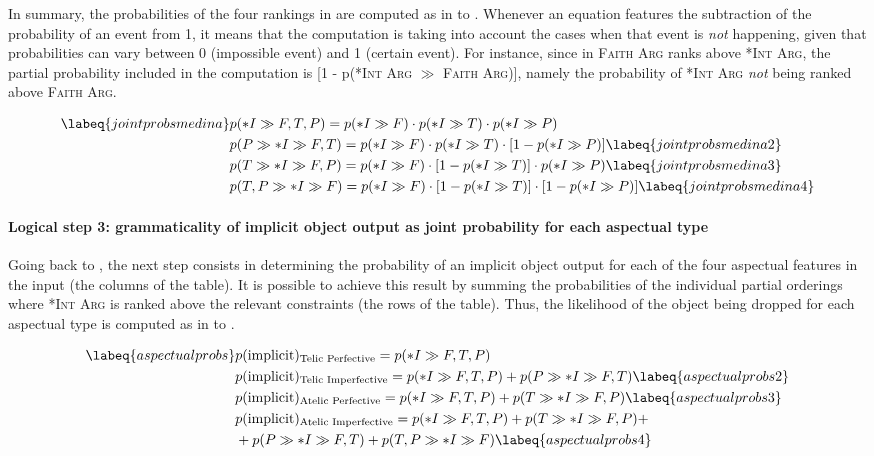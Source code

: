 In summary, the probabilities of the four rankings in  are computed as in  to . Whenever an equation features the subtraction of the probability of an event from 1, it means that the computation is taking into account the cases when that event is \textit{not} happening, given that probabilities can vary between 0 (impossible event) and 1 (certain event). For instance, since in  \textsc{Faith Arg} ranks above \textsc{*Int Arg}, the partial probability included in the computation is [1 - p(\textsc{*Int Arg} $\gg$ \textsc{Faith Arg})], namely the probability of \textsc{*Int Arg} \textit{not} being ranked above \textsc{Faith Arg}.

\begin{align}  \labeq{jointprobsmedina} %
    & p(*I \gg {F, T, P}) = p(*I \gg F) \cdot p(*I \gg T) \cdot p(*I \gg P) \\
    & p(P \gg *I \gg {F, T}) = p(*I \gg F) \cdot p(*I \gg T) \cdot [1 - p(*I \gg P)] \labeq{jointprobsmedina2}\\
    & p(T \gg *I \gg {F, P}) = p(*I \gg F) \cdot [1 - p(*I \gg T)] \cdot p(*I \gg P) \labeq{jointprobsmedina3}\\
    & p({T, P} \gg *I \gg F) = p(*I \gg F) \cdot [1 - p(*I \gg T)] \cdot [1 - p(*I \gg P)] \labeq{jointprobsmedina4}
\end{align}

\paragraph{Logical step 3: grammaticality of implicit object output as joint probability for each aspectual type} Going back to , the next step consists in determining the probability of an implicit object output for each of the four aspectual features in the input (the columns of the table). It is possible to achieve this result by summing the probabilities of the individual partial orderings where \textsc{*Int Arg} is ranked above the relevant constraints (the rows of the table). Thus, the likelihood of the object being dropped for each aspectual type is computed as in  to .

\begin{align}  \labeq{aspectualprobs}
    & p(\text{implicit})\textsubscript{Telic Perfective} = p(*I \gg {F, T, P}) \\
    & p(\text{implicit})\textsubscript{Telic Imperfective} = p(*I \gg {F, T, P}) + p(P \gg *I \gg {F, T}) \labeq{aspectualprobs2}\\
    & p(\text{implicit})\textsubscript{Atelic Perfective} = p(*I \gg {F, T, P}) + p(T \gg *I \gg {F, P}) \labeq{aspectualprobs3}\\
    & p(\text{implicit})\textsubscript{Atelic Imperfective} = p(*I \gg {F, T, P}) + p(T \gg *I \gg {F, P}) + \nonumber \\ & + p(P \gg *I \gg {F, T}) + p({T, P} \gg *I \gg F) \labeq{aspectualprobs4}
\end{align}

